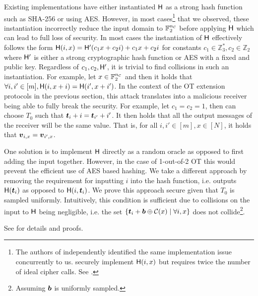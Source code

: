 Existing implementations\cite{libOTe,encrypto,KOS,EMP} have either instantiated $\H$ as a strong hash function such as SHA-256 or using AES. However, in most cases\footnote{\label{empNote}The authors of \cite{EMP,GKWY19} independently identified the same implementation issue concurrently to us. \cite{EMP} securely implement $\H(i,x)$ but requires twice the number of ideal cipher calls. See \cite{GKWY19}. } that we observed\cite{libOTe,encrypto,KOS}, these instantiation incorrectly reduce the input domain to $\mathbb{F}^\nc_2$ before applying $\H$ which can lead to full loss of security. In most cases the instantiation of $\H$ effectively follows the form $\H(i,x)=\H'(c_1 x + c_2 i) + c_1 x + c_2 i$ for constants $c_1\in\mathbb{Z}^*_3,c_2\in\mathbb{Z}_2$ where $\H'$ is either a strong cryptographic hash function or AES with a fixed and public key. Regardless of $c_1,c_2,\H'$, it is trivial to find collisions in such an instantiation. For example, let $x\in\mathbb{F}^\nc_2$ and then it holds that $\forall i,i'\in[m], \H(i,x+i)=\H(i', x+i')$. In the context of the OT extension protocols in the previous section, this attack translates into a malicious receiver being able to fully break the security.
\iffullversion
 For example, let $c_1=c_2=1$, then \rec can choose $T_0$ such that $\tt_i+i=\tt_{i'}+i'$. It then holds that all the output messages of the receiver will be the same value.  That is, for all $i,i'\in[m],x\in[N]$, it holds that $\vv_{i,x}=\vv_{i',x}$. 
\fi



One solution is to implement $\H$ directly as a random oracle as opposed to first adding the input together. However, in the case of 1-out-of-2 OT this would prevent the efficient use of AES based hashing. We take a different approach by removing the requirement for inputting $i$ into the hash function, i.e. \rec outputs $\H(\tt_i)$ as opposed to $\H(i,\tt_i)$. We prove this approach secure given that $T_0$ is sampled uniformly. Intuitively, this condition is sufficient due to collisions on the input to $\H$ being negligible, i.e. the set $\{\tt_i + \bb\oplus\mathcal{C}(x) \mid \forall i,x\}$ does not collide\footnote{Assuming $\bb$ is uniformly sampled.}.

See  for details and proofs.